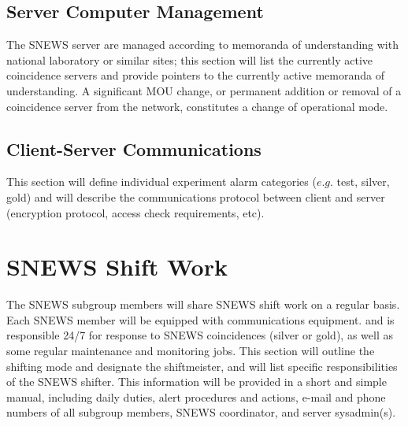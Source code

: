 \documentclass{article}
\begin{document}
\subsection{Server Computer Management}

The SNEWS server are managed according to memoranda
of understanding with national laboratory or similar sites;
this section will list the currently active coincidence
servers and provide pointers to the currently active memoranda
of understanding.  A significant MOU change, or permanent addition
or removal of a coincidence server from the network,  
constitutes a change of operational mode.


\subsection{Client-Server Communications}

This section will define individual experiment alarm categories 
($e.g.$ test, silver, gold) and will describe the 
communications protocol between client and server (encryption
protocol, access check requirements, etc).

\section{SNEWS Shift Work}

The SNEWS subgroup members will share SNEWS shift work on
a regular basis.  Each SNEWS member will be equipped with
communications equipment.
and is responsible 24/7 for response to SNEWS coincidences
(silver or gold), as well as some regular maintenance and monitoring jobs.
This section will outline the shifting mode and designate
the shiftmeister, and will list specific responsibilities of the 
SNEWS shifter.   This information will be provided in a short and
simple manual, including daily duties, alert procedures and
actions, e-mail and phone numbers of all subgroup members, SNEWS
coordinator, and server sysadmin(s).
\end{document}
